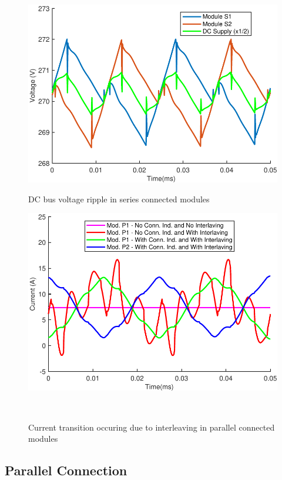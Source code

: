 \begin{figure}[b]
  \includegraphics[width=\linewidth]{figures/series_volt_ripple.pdf}
  \caption{DC bus voltage ripple in series connected modules}\label{fig:series_volt_ripple}
\endminipage\hfill
{}
  \includegraphics[width=\linewidth]{figures/parallel_current_trans.pdf}
  \caption{Current transition occuring due to interleaving in parallel connected modules}\label{fig:parallel_current_trans}
\endminipage\
\end{figure}

\subsection{Parallel Connection}

